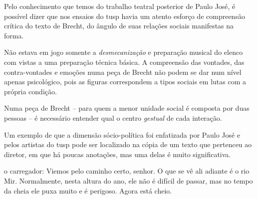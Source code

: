 \subject{Análise social do texto}

Pelo conhecimento que temos do trabalho teatral posterior de Paulo José,
é possível dizer que nos ensaios do {\sc tusp} havia um atento esforço de
compreensão crítica do texto de Brecht, do ângulo de suas relações
sociais manifestas na forma.

Não estava em jogo somente a {\it desmecanização} e preparação musical
do elenco com vistas a uma preparação técnica básica. A compreensão das
vontades, das contra-vontades e emoções numa peça de Brecht não podem se
dar num nível apenas psicológico, pois as figuras correspondem a tipos
sociais em lutas com a própria condição.

Numa peça de Brecht -- para quem a menor unidade social é composta por
duas pessoas -- é necessário entender qual o centro {\it gestual} de cada
interação.

Um exemplo de que a dimensão sócio-política foi enfatizada por Paulo
José e pelos artistas do {\sc tusp} pode ser localizado na cópia de um texto
que pertenceu ao diretor, em que há poucas anotações, mas uma delas é
muito significativa.


\startblockquote
{\sc o carregador}: Viemos pelo caminho certo, senhor. O que se vê ali adiante
é o rio Mir. Normalmente, nesta altura do ano, ele não é difícil de
passar, mas no tempo da cheia ele puxa muito e é perigoso. Agora está
cheio.

